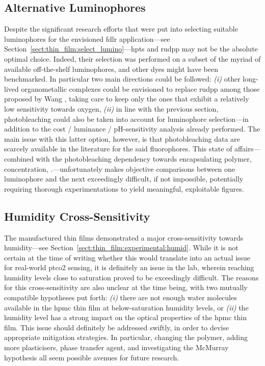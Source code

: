 \subsection{Alternative Luminophores}

Despite the significant research efforts that were put into selecting suitable luminophores for the envisioned \gls{fdlr} application---see Section~\ref{sect:thin_film:select_lumino}---\gls{hpts} and \gls{rudpp} may not be the absolute optimal choice. Indeed, their selection was performed on a subset of the myriad of available off-the-shelf luminophores, and other dyes might have been benchmarked. In particular two main directions could be followed: \textit{(i)} other long-lived organometallic complexes could be envisioned to replace \gls{rudpp} among those proposed by Wang \etal{}\cite[Sect.~6.2]{wang2014wolfbeis}, taking care to keep only the ones that exhibit a relatively low sensitivity towards oxygen, \textit{(ii)} in line with the previous section, photobleaching could also be taken into account for luminophore selection---in addition to the cost / luminance / pH-sensitivity analysis already performed. The main issue with this latter option, however, is that photobleaching data are scarcely available in the literature for the said fluorophores. This state of affairs---combined with the photobleaching dependency towards encapsulating polymer, concentration, \etc.---unfortunately makes objective comparisons between one luminophore and the next exceedingly difficult, if not impossible, potentially requiring thorough experimentations to yield meaningful, exploitable figures.

\subsection{Humidity Cross-Sensitivity}\label{sect:conclusion:humidity}

The manufactured thin films demonstrated a major cross-sensitivity towards humidity---see Section~\ref{sect:thin_film:experimental:humid}. While it is not certain at the time of writing whether this would translate into an actual issue for real-world \gls{ptco2} sensing, it is definitely an issue in the lab, wherein reaching humidity levels close to saturation proved to be exceedingly difficult. The reasons for this cross-sensitivity are also unclear at the time being, with two mutually compatible hypotheses put forth: \textit{(i)} there are not enough water molecules available in the \gls{hpmc} thin film at below-saturation humidity levels, or \textit{(ii)} the humidity level has a strong impact on the optical properties of the \gls{hpmc} thin film. This issue should definitely be addressed swiftly, in order to devise appropriate mitigation strategies. In particular, changing the polymer, adding more plasticisers, phase transfer agent, and investigating the McMurray hypothesis all seem possible avenues for future research.

